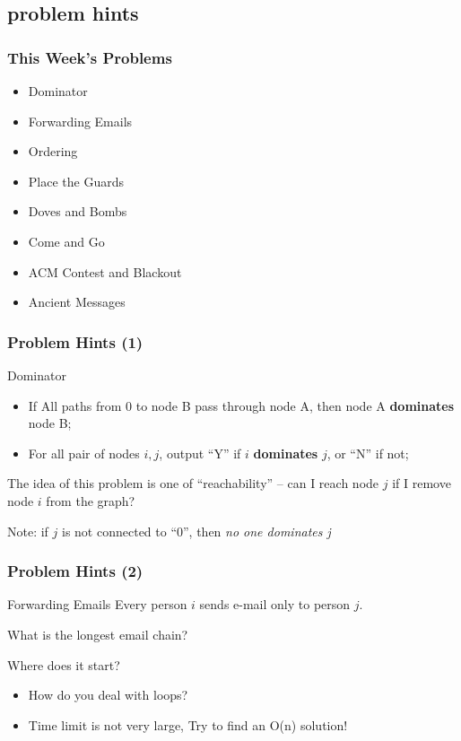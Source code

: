 \subsection{problem hints}

\begin{frame}
  \frametitle{This Week's Problems}
  \begin{itemize}
  \item Dominator
  \item Forwarding Emails
  \item Ordering
  \item Place the Guards
  \item Doves and Bombs
  \item Come and Go
  \item ACM Contest and Blackout
  \item Ancient Messages
  \end{itemize}
\end{frame}

\begin{frame}
  \frametitle{Problem Hints (1)}  
  {\smaller
    \begin{block}{Dominator}
      \begin{itemize}
        \item If All paths from 0 to node B pass through node A, then node A {\bf dominates} node B;
        \item For all pair of nodes $i,j$, output ``Y'' if $i$ {\bf dominates} $j$, or ``N'' if not;
      \end{itemize}
    \end{block}

    \bigskip

    The idea of this problem is one of ``reachability'' -- can I reach
    node $j$ if I remove node $i$ from the graph?

    \bigskip

    Note: if $j$ is not connected to ``0'', then \emph{no one dominates j}
  }
\end{frame}

\begin{frame}
  \frametitle{Problem Hints (2)}
  {\smaller
    \begin{block}{Forwarding Emails}
      Every person $i$ sends e-mail only to person $j$.
      
      \bigskip
      
      What is the longest email chain?
      
      \bigskip
      
      Where does it start?
    \end{block}
    
    \begin{itemize}
    \item How do you deal with loops?
    \item Time limit is not very large, Try to find an O(n) solution!
    \end{itemize} 
  }
\end{frame}


